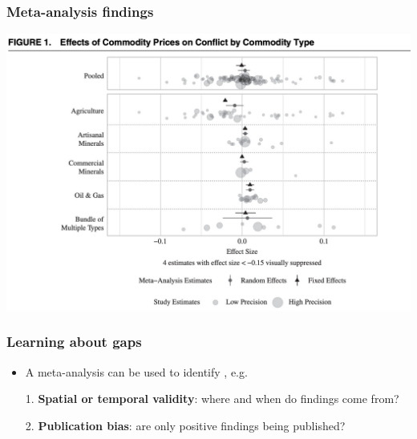 \documentclass[aspectratio=43]{beamer}
\begin{document}
\begin{frame}
\frametitle{Meta-analysis findings}
\centering

\includegraphics[width = \textwidth]{../img/blair_apsr3}

\end{frame}

\begin{frame}
\frametitle{Learning about gaps}
\centering

\begin{itemize}
  \item A meta-analysis can be used to identify , e.g.
  \item[1.] \textbf{Spatial or temporal validity}: where and when do findings come from?
  \item[2.] \textbf{Publication bias}: are only positive findings being published?
\end{itemize}

\end{frame}

\end{document}
